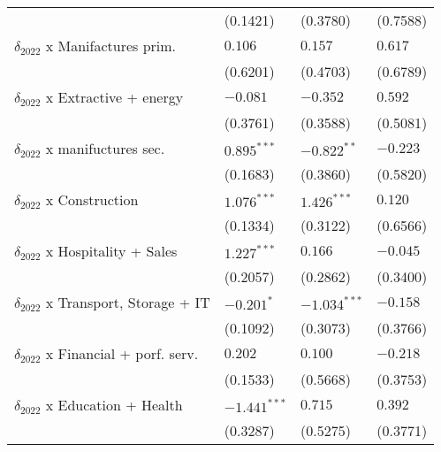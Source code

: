 \begin{tabular}{llll}
                                                   &           (0.1421) &           (0.3780) &           (0.7588) \\
$\delta_{2022}$ x Manifactures prim.               &            $0.106$ &            $0.157$ &            $0.617$ \\
                                                   &           (0.6201) &           (0.4703) &           (0.6789) \\
$\delta_{2022}$ x Extractive + energy              &           $-0.081$ &           $-0.352$ &            $0.592$ \\
                                                   &           (0.3761) &           (0.3588) &           (0.5081) \\
$\delta_{2022}$ x manifuctures sec.                &      $0.895^{***}$ &      $-0.822^{**}$ &           $-0.223$ \\
                                                   &           (0.1683) &           (0.3860) &           (0.5820) \\
$\delta_{2022}$ x Construction                     &      $1.076^{***}$ &      $1.426^{***}$ &            $0.120$ \\
                                                   &           (0.1334) &           (0.3122) &           (0.6566) \\
$\delta_{2022}$ x Hospitality + Sales              &      $1.227^{***}$ &            $0.166$ &           $-0.045$ \\
                                                   &           (0.2057) &           (0.2862) &           (0.3400) \\
$\delta_{2022}$ x Transport, Storage + IT          &         $-0.201^*$ &     $-1.034^{***}$ &           $-0.158$ \\
                                                   &           (0.1092) &           (0.3073) &           (0.3766) \\
$\delta_{2022}$ x Financial + porf. serv.          &            $0.202$ &            $0.100$ &           $-0.218$ \\
                                                   &           (0.1533) &           (0.5668) &           (0.3753) \\
$\delta_{2022}$ x Education + Health               &     $-1.441^{***}$ &            $0.715$ &            $0.392$ \\
                                                   &           (0.3287) &           (0.5275) &           (0.3771) \\

\end{tabular}
